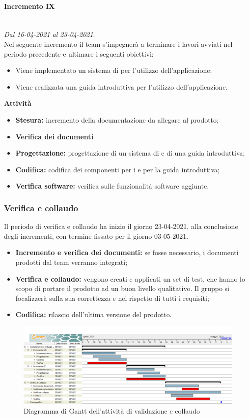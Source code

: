 \paragraph{Incremento IX}\textit{}\\
\textit{Dal 16-04-2021 al 23-04-2021}. \\ 
Nel seguente incremento il team s'impegnerà a terminare i lavori avviati nel periodo precedente e ultimare i seguenti obiettivi:
\begin{itemize}
	\item Viene implementato un sistema di  per l'utilizzo dell'applicazione;
	\item Viene realizzata una guida introduttiva per l'utilizzo dell'applicazione.
\end{itemize}			
\textbf{Attività}			
\begin{itemize}
\item \textbf{Stesura:} incremento della documentazione da allegare al prodotto;
\item \textbf{Verifica dei documenti} 
\item \textbf{Progettazione:} progettazione di un sistema di  e di una guida introduttiva;
\item \textbf{Codifica:} codifica dei componenti per i  e per la guida introduttiva;
\item \textbf{Verifica software:} verifica sulle funzionalità software aggiunte.
\end{itemize}
\subsubsection{Verifica e collaudo}
Il periodo di verifica e collaudo ha inizio il giorno 23-04-2021, alla conclusione degli incrementi, con termine fissato per il giorno 03-05-2021.
\begin{itemize}
	\item \textbf{Incremento e verifica dei documenti:} se fosse necessario, i documenti prodotti dal team verranno integrati;
	\item \textbf{Verifica e collaudo:} vengono creati e applicati un set di test, che hanno lo scopo di portare il prodotto ad un buon livello qualitativo. Il gruppo si focalizzerà sulla sua correttezza e nel rispetto di tutti i requisiti;
	\item \textbf{Codifica:} rilascio dell'ultima versione del prodotto.
\end{itemize}

\begin{landscape}
\begin{figure}[h]
	\centering
	\includegraphics[width=\linewidth]{Images/GanttPianificazioneValidazioneCollaudo.PNG}
	\caption{Diagramma di Gantt dell'attività di validazione e collaudo}
\end{figure}
\end{landscape}



